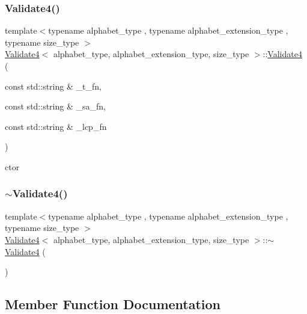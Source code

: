 \subsubsection{\texorpdfstring{Validate4()}{Validate4()}}
{\footnotesize\ttfamily template$<$typename alphabet\+\_\+type , typename alphabet\+\_\+extension\+\_\+type , typename size\+\_\+type $>$ \\
\hyperlink{class_validate4}{Validate4}$<$ alphabet\+\_\+type, alphabet\+\_\+extension\+\_\+type, size\+\_\+type $>$\+::\hyperlink{class_validate4}{Validate4} (\begin{DoxyParamCaption}\item[{const std\+::string \&}]{\+\_\+t\+\_\+fn,  }\item[{const std\+::string \&}]{\+\_\+sa\+\_\+fn,  }\item[{const std\+::string \&}]{\+\_\+lcp\+\_\+fn }\end{DoxyParamCaption})\hspace{0.3cm}{\ttfamily [inline]}}



ctor 

\mbox{\label{class_validate4_a4098c3ea14d8a58ac6bf2aae8fa6071e}} 
\subsubsection{\texorpdfstring{$\sim$\+Validate4()}{~Validate4()}}
{\footnotesize\ttfamily template$<$typename alphabet\+\_\+type , typename alphabet\+\_\+extension\+\_\+type , typename size\+\_\+type $>$ \\
\hyperlink{class_validate4}{Validate4}$<$ alphabet\+\_\+type, alphabet\+\_\+extension\+\_\+type, size\+\_\+type $>$\+::$\sim$\hyperlink{class_validate4}{Validate4} (\begin{DoxyParamCaption}{ }\end{DoxyParamCaption})\hspace{0.3cm}{\ttfamily [inline]}}



\subsection{Member Function Documentation}
\mbox{\label{class_validate4_a6ec70437413135bc1a00c7c2310ece46}} 
